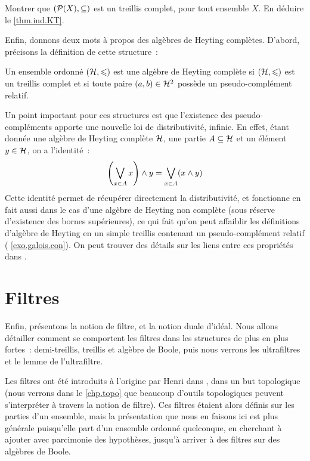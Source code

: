 \begin{exercise}
  Montrer que $(\mathcal{P}(X),\subseteq)$ est un treillis complet, pour tout
  ensemble $X$. En déduire le \cref{thm.ind.KT}.
\end{exercise}

Enfin, donnons deux mots à propos des algèbres de Heyting complètes.
D'abord, précisons la définition de cette structure~:

\begin{definition}
  Un ensemble ordonné $(\mathcal{H},\leqslant)$ est une algèbre de Heyting complète
  si $(\mathcal{H},\leqslant)$ est un treillis complet et si toute paire
  $(a,b)\in \mathcal{H}^2$ possède un pseudo-complément relatif.
\end{definition}

Un point important pour ces structures est que l'existence des
pseudo-compléments apporte une nouvelle loi de distributivité, infinie. En
effet, étant donnée une algèbre de Heyting complète $\mathcal{H}$, une partie
$A\subseteq \mathcal{H}$ et un élément $y\in \mathcal{H}$, on a l'identité~:
\[\left(\bigvee_{x\in A} x\right)\wedge y = \bigvee_{x \in A}(x \wedge y)\]
Cette identité permet de récupérer directement la distributivité, et fonctionne
en fait aussi dans le cas d'une algèbre de Heyting non complète (sous
réserve d'existence des bornes supérieures), ce qui fait qu'on peut affaiblir
les définitions d'algèbre de Heyting en un simple treillis contenant un
pseudo-complément relatif ( \cref{exo.galois.con}). On peut
trouver des détails sur les liens entre ces propriétés dans \cite{Gratzer2011}.

\section{Filtres}

Enfin, présentons la notion de filtre, et la notion duale d'idéal. Nous allons
détailler comment se comportent les filtres dans les structures de plus en plus
fortes~: demi-treillis, treillis et algèbre de Boole, puis nous verrons
les ultrafiltres et le lemme de l'ultrafiltre.

Les filtres ont été introduits à l'origine par Henri  dans
\cite{Bourbaki2007Topologie1}, dans un but topologique (nous verrons dans le
\cref{chp.topo} que beaucoup d'outils topologiques peuvent s'interpréter à
travers la notion de filtre). Ces filtres étaient alors définis sur les parties
d'un ensemble, mais la présentation que nous en faisons ici est plus générale
puisqu'elle part d'un ensemble ordonné quelconque, en cherchant à ajouter avec
parcimonie des hypothèses, jusqu'à arriver à des filtres sur des algèbres de
Boole.

